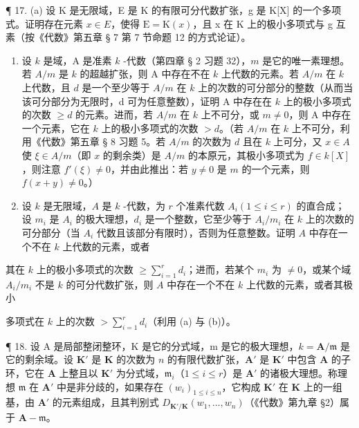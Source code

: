 ¶ 17. (a) 设 K 是无限域，E 是 K 的有限可分代数扩张，g 是 K{[}X{]} 的一个多项式。证明存在元素 \(x \in E\)，使得 \(\mathrm{E} = \mathrm{K}(x)\)，且 x 在 K 上的极小多项式与 g 互素（按《代数》第五章 § 7 第 7 节命题 12 的方式论证）。

\begin{enumerate}
\def\labelenumi{(\alph{enumi})}
\setcounter{enumi}{1}
\item
  设 \(k\) 是域，A 是准素 \(k\) -代数（第四章 § 2 习题 32），\(m\) 是它的唯一素理想。若 \(A / m\) 是 \(k\) 的超越扩张，则 A 中存在不在 \(k\) 上代数的元素。若 \(A / m\) 在 \(k\) 上代数，且 \(d\) 是一个至少等于 \(A / m\) 在 \(k\) 上的次数的可分部分的整数（从而当该可分部分为无限时，d 可为任意整数），证明 A 中存在在 \(k\) 上的极小多项式的次数 \(\geqslant d\) 的元素。进而，若 \(A / m\) 在 \(k\) 上不可分，或 \(m \neq 0\)，则 A 中存在一个元素，它在 \(k\) 上的极小多项式的次数 \(>d\)。（若 \(A / m\) 在 \(k\) 上不可分，利用《代数》第五章 § 8 习题 5。若 \(A / m\) 的次数为 \(d\) 且在 \(k\) 上可分，又 \(x \in A\) 使 \(\xi \in A / m\)（即 \(x\) 的剩余类）是 \(A / m\) 的本原元，其极小多项式为 \(f \in k[X]\)，则注意 \(f'(\xi) \neq 0\)，并由此推出：若 \(y \neq 0\) 是 \(m\) 的一个元素，则 \(f(x + y) \neq 0\)。）
\item
  设 \(k\) 是无限域，\(A\) 是 \(k\) -代数，为 \(r\) 个准素代数 \(A_{i} (1 \leqslant i \leqslant r)\) 的直合成；设 \(m_{i}\) 是 \(A_{i}\) 的极大理想，\(d_{i}\) 是一个整数，它至少等于 \(A_{i} / m_{i}\) 在 \(k\) 上的次数的可分部分（当 \(A_{i}\) 代数且该部分有限时），否则为任意整数。证明 \(A\) 中存在一个不在 \(k\) 上代数的元素，或者
\end{enumerate}

其在 \(k\) 上的极小多项式的次数 \(\geqslant \sum_{i=1}^{r} d_i\)；进而，若某个 \(m_i\) 为 \(\neq 0\)，或某个域 \(A_i / m_i\) 不是 \(k\) 的可分代数扩张，则 \(A\) 中存在一个不在 \(k\) 上代数的元素，或者其极小

多项式在 \(k\) 上的次数 \(> \sum_{i=1}^{r} d_i\)（利用 (a) 与 (b)）。

¶ 18. 设 A 是局部整闭整环，K 是它的分式域，m 是它的极大理想，\(k = \mathbf{A} / \mathfrak{m}\) 是它的剩余域。设 \(\mathbf{K}'\) 是 \(\mathbf{K}\) 的次数为 \(n\) 的有限代数扩张，\(\mathbf{A}'\) 是 \(\mathbf{K}'\) 中包含 \(\mathbf{A}\) 的子环，它在 \(\mathbf{A}\) 上整且以 \(\mathbf{K}'\) 为分式域，\(\mathfrak{m}_i\)（\(1 \leqslant i \leqslant r\)）是 \(\mathbf{A}'\) 的诸极大理想。称理想 \(\mathfrak{m}\) 在 \(\mathbf{A}'\) 中是非分歧的，如果存在 \((w_i)_{1 \leqslant i \leqslant n}\)，它构成 \(\mathbf{K}'\) 在 \(\mathbf{K}\) 上的一组基，由 \(\mathbf{A}'\) 的元素组成，且其判别式 \(D_{\mathbf{K}' / \mathbf{K}}(w_1, \ldots, w_n)\)（《代数》第九章 §2）属于 \(\mathbf{A} - \mathfrak{m}\)。

